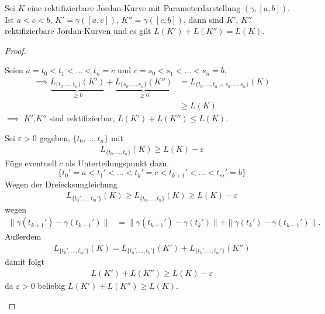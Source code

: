 
\begin{theorem}[Hilfssatz] \label{thm:6.12}
  Sei $K$ eine rektifizierbare Jordan-Kurve mit Parameterdarstellung $(\gamma,[a,b])$. Ist $a < c < b$, $K' = \gamma([a,c])$, $K'' = \gamma([c,b])$, dann sind $K'$, $K''$ rektifizierbare Jordan-Kurven und es gilt $L(K') + L(K'') = L(K)$.
  
  \begin{proof}
    \begin{enum-arab}
      \item Seien $a = t_0 < t_1 < \ldots < t_n = c$ und $c = s_0 < s_1 < \ldots < s_n = b$.
      \begin{align*}
        \implies
        \underbrace{L_{\{t_0,\ldots,t_n\}}(K')}_{\geq 0}
        + \underbrace{L_{\{s_0,\ldots,s_n\}}(K'')}_{\geq 0}
        &= L_{\{t_0,\ldots,t_n=s_0,\ldots,s_n\}}(K) \\
        &\geq L(K)
      \end{align*}
      $\implies$ $K'$,$K''$ sind rektifizierbar, $L(K') + L(K'') \leq L(K)$.
      
      \item Sei $\varepsilon > 0$ gegeben, $\{t_0,\ldots,t_n\}$ mit
      \begin{align*}
        L_{\{t_0,\ldots,t_n\}}(K) \geq L(K) - \varepsilon
      \end{align*}
      Füge eventuell $c$ als Unterteilungspunkt dazu. \[\{t_0' = a < t_1' < \ldots < t_k' = c < t_{k+1}' < \ldots < t_m' = b\}\] Wegen der Dreiecksungleichung
      \begin{align*}
        L_{\{t_0',\ldots,t_m'\}}(K) \geq L_{\{t_0,\ldots,t_n\}}(K) \geq L(K) - \varepsilon
      \end{align*}
      wegen
      \begin{align*}
        \|\gamma(t_{k+1}')-\gamma(t_{k-1}')\| &= \|\gamma(t_{k+1}')-\gamma(t_{k}')\| + \|\gamma(t_{k}')-\gamma(t_{k-1}')\|.
      \end{align*}
      Außerdem
      \begin{align*}
        L_{\{t_0',\ldots,t_m'\}}(K) = L_{\{t_0',\ldots,t_k'\}}(K') + L_{\{t_k',\ldots,t_m'\}}(K'')
      \end{align*}
      damit folgt
      \begin{align*}
        L(K') + L(K'') \geq L(K) - \varepsilon
      \end{align*}
      da $\varepsilon > 0$ beliebig $L(K') + L(K'') \geq L(K)$.
      

\end{enum-arab}
\end{proof}
\end{theorem}
